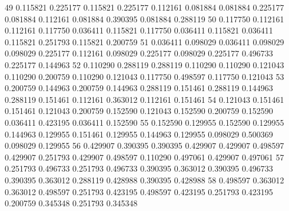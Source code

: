{   49    0.115821     0.225177    0.115821    0.225177              0.112161             0.081884           0.081884             0.225177                0.081884                0.112161               0.081884              0.390395               0.081884                0.288119
   50    0.117750     0.112161    0.112161    0.117750              0.036411             0.115821           0.117750             0.036411                0.115821                0.036411               0.115821              0.251793               0.115821                0.200759
   51    0.036411     0.098029    0.036411    0.098029              0.098029             0.225177           0.112161             0.098029                0.225177                0.098029               0.225177              0.496733               0.225177                0.144963
   52    0.110290     0.288119    0.288119    0.110290              0.110290             0.121043           0.110290             0.200759                0.110290                0.121043               0.117750              0.498597               0.117750                0.121043
   53    0.200759     0.144963    0.200759    0.144963              0.288119             0.151461           0.288119             0.144963                0.288119                0.151461               0.112161              0.363012               0.112161                0.151461
   54    0.121043     0.151461    0.151461    0.121043              0.200759             0.152590           0.121043             0.152590                0.200759                0.152590               0.036411              0.423195               0.036411                0.152590
   55    0.152590     0.129955    0.152590    0.129955              0.144963             0.129955           0.151461             0.129955                0.144963                0.129955               0.098029              0.500369               0.098029                0.129955
   56    0.429907     0.390395    0.390395    0.429907              0.429907             0.498597           0.429907             0.251793                0.429907                0.498597               0.110290              0.497061               0.429907                0.497061
   57    0.251793     0.496733    0.251793    0.496733              0.390395             0.363012           0.390395             0.496733                0.390395                0.363012               0.288119              0.428988               0.390395                0.428988
   58    0.498597     0.363012    0.363012    0.498597              0.251793             0.423195           0.498597             0.423195                0.251793                0.423195               0.200759              0.345348               0.251793                0.345348
}
